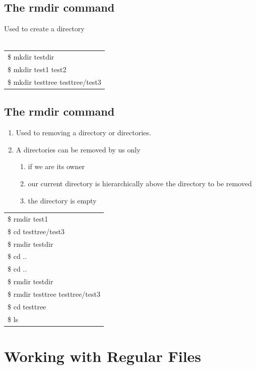 \documentclass[12pt, a4paper]{report}
\begin{document}
\section{The rmdir command}
Used to create a directory\\
\\
\begin{tabular}{|l|}\hline
\$ mkdir testdir \\
\$ mkdir test1 test2\\
\$ mkdir testtree testtree/test3\\ \hline
\end{tabular}
\section{The rmdir command}
\begin{enumerate}
\item Used to removing a directory or directories.
\item A directories can be removed by us only 
\begin{enumerate}
\item if we are its owner
\item our current directory is hierarchically above the directory to be removed
\item the directory is empty
\end{enumerate}
\end{enumerate}
\begin{tabular}{|l|}\hline
\$ rmdir test1\\
\$ cd testtree/test3\\
\$ rmdir testdir\\
\$ cd ..\\
\$ cd ..\\
\$ rmdir testdir\\
\$ rmdir testtree testtree/test3\\
\$ cd testtree\\
\$ ls\\ \hline
\end{tabular}
%
\chapter{Working with Regular Files}
\end{document}
